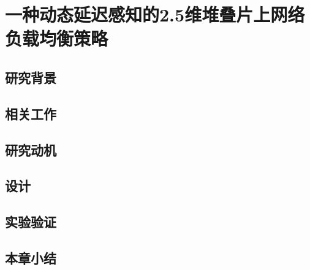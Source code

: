 \chapter{一种动态延迟感知的2.5维堆叠片上网络负载均衡策略}
\label{chap:DLL}

\section{研究背景}

\section{相关工作}

\section{研究动机}


\section{设计}

\section{实验验证}

\section{本章小结}

